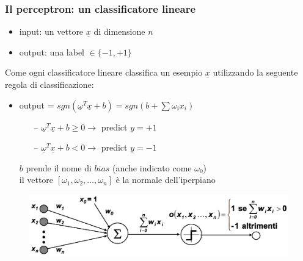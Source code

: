 \begin{frame}
	
	\frametitle{Il perceptron: un classificatore lineare}
	
		\begin{itemize}
			\item input: un vettore $\underline{x}$ di dimensione $n$
			\item output: una label $\in \{-1, +1\}$
		\end{itemize}
		
		Come ogni classificatore lineare classifica un esempio $\underline{x}$ utilizzando la seguente regola di classificazione:
		\begin{itemize}
			\item output = $sgn(\underline{\omega}^T\underline{x} + b) = sgn( b + \sum\omega_i x_i )$
			\begin{itemize}
				\item[--] $\underline{\omega}^T\underline{x} + b \geq 0 \rightarrow$ predict $y = +1$
				\item[--] $\underline{\omega}^T\underline{x} + b < 0 \rightarrow$ predict $y = -1$
			\end{itemize}
			$b$ prende il nome di $bias$ (anche indicato come $\omega_0$)\\
			il vettore $[ \omega_1, \omega_2, \dots, \omega_n ]$ è la normale dell'iperpiano
		\end{itemize}
		
		
		\begin{figure}[!htbp]
			\centering
			\includegraphics[width=1.0\linewidth]{images/supervised/perceptron/perceptron_formula.png}
		\end{figure}

\end{frame}


